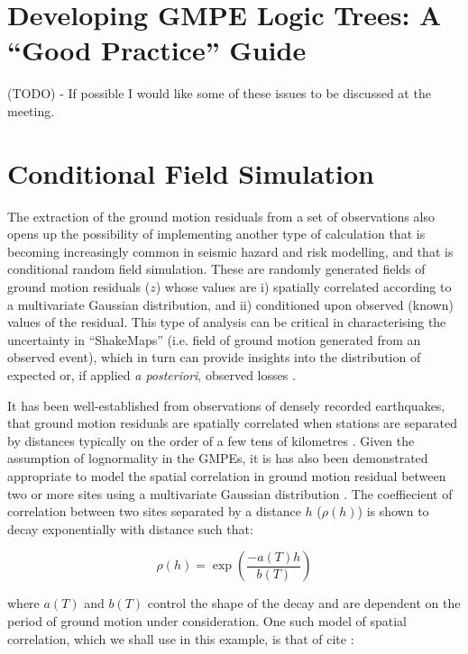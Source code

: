 \section{Developing GMPE Logic Trees: A ``Good Practice'' Guide}
\label{sec:logic_tree}

(TODO) - If possible I would like some of these issues to be discussed at the meeting.

\section{Conditional Field Simulation}
\label{sec:cond_field}

The extraction of the ground motion residuals from a set of observations also opens up the possibility of implementing another type of calculation that is becoming increasingly common in seismic hazard and risk modelling, and that is conditional random field simulation. These are randomly generated fields of ground motion residuals ($z$) whose values are i) spatially correlated according to a multivariate Gaussian distribution, and ii) conditioned upon observed (known) values of the residual. This type of analysis can be critical in characterising the uncertainty in ``ShakeMaps'' (i.e. field of ground motion generated from an observed event), which in turn can provide insights into the distribution of expected or, if applied \emph{a posteriori}, observed losses \citep[e.g.][]{Park_etal2007, Crowley_etal2008b, Stafford2012}.

It has been well-established from observations of densely recorded earthquakes, that ground motion residuals are spatially correlated when stations are separated by distances typically on the order of a few tens of kilometres \citep{Jayaram2009}. Given the assumption of lognormality in the GMPEs, it is has also been demonstrated appropriate to model the spatial correlation in ground motion residual between two or more sites using a multivariate Gaussian distribution \citep{JayaramBaker2009}. The coeffiecient of correlation between two sites separated by a distance $h$ ($\rho \left( h \right)$) is shown to decay exponentially with distance such that:

\begin{equation}
\rho \left( h \right) = \exp \left( {\frac{-a\left(T\right) h}{b \left(T\right)}} \right)
\end{equation}

\noindent where $a\left( T \right)$ and $b\left( T \right)$ control the shape of the decay and are dependent on the period of ground motion under consideration. One such model of spatial correlation, which we shall use in this example, is that of cite \cite{Jayaram2009}:

